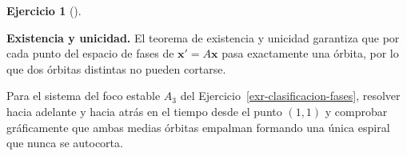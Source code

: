 \documentclass[
  spanish,
  a4paper,
]{scrreport}
\theoremstyle{definition}
\newtheorem{exercise}{Ejercicio}[chapter]
\theoremstyle{remark}
\begin{document}
\begin{exercise}[]\protect\hypertarget{exr-existencia-unicidad}{}\label{exr-existencia-unicidad}

\textbf{Existencia y unicidad.} El teorema de existencia y unicidad
garantiza que por cada punto del espacio de fases de
\(\mathbf{x}'=A\mathbf{x}\) pasa exactamente una órbita, por lo que dos
órbitas distintas no pueden cortarse.

Para el sistema del foco estable \(A_3\) del
Ejercicio~\ref{exr-clasificacion-fases}, resolver hacia adelante y hacia
atrás en el tiempo desde el punto \((1, 1)\) y comprobar gráficamente
que ambas medias órbitas empalman formando una única espiral que nunca
se autocorta.

\begin{tcolorbox}[enhanced jigsaw, arc=.35mm, bottomrule=.15mm, bottomtitle=1mm, breakable, colback=white, colbacktitle=quarto-callout-tip-color!10!white, colframe=quarto-callout-tip-color-frame, coltitle=black, left=2mm, leftrule=.75mm, opacityback=0, opacitybacktitle=0.6, rightrule=.15mm, title=\textcolor{quarto-callout-tip-color}{\faLightbulb}\hspace{0.5em}{Solución}, titlerule=0mm, toprule=.15mm, toptitle=1mm]


\end{tcolorbox}
\end{exercise}
\end{document}
